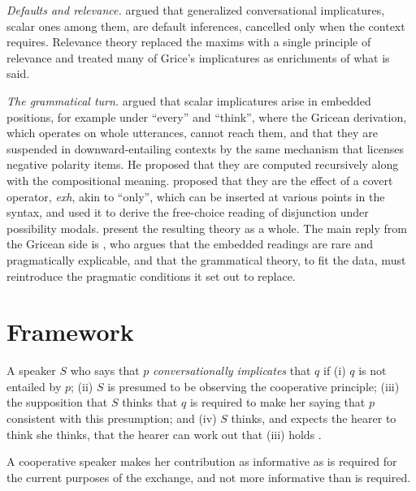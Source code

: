 \documentclass{situationist-preprint}
\begin{document}
\emph{Defaults and relevance.} \citet{Levinson2000} argued that generalized conversational implicatures, scalar ones among them, are default inferences, cancelled only when the context requires. Relevance theory \citep{SperberWilson1986} replaced the maxims with a single principle of relevance and treated many of Grice's implicatures as enrichments of what is said.

\emph{The grammatical turn.} \citet{Chierchia2004} argued that scalar implicatures arise in embedded positions, for example under \enquote{every} and \enquote{think}, where the Gricean derivation, which operates on whole utterances, cannot reach them, and that they are suspended in downward-entailing contexts by the same mechanism that licenses negative polarity items. He proposed that they are computed recursively along with the compositional meaning. \citet{Fox2007} proposed that they are the effect of a covert operator, \emph{exh}, akin to \enquote{only}, which can be inserted at various points in the syntax, and used it to derive the free-choice reading of disjunction under possibility modals. \citet{ChierchiaFoxSpector2012} present the resulting theory as a whole. The main reply from the Gricean side is \citet{Geurts2010}, who argues that the embedded readings are rare and pragmatically explicable, and that the grammatical theory, to fit the data, must reintroduce the pragmatic conditions it set out to replace.

\section{Framework}

\begin{definition}\label{d:imp}
A speaker $S$ who says that $p$ \emph{conversationally implicates} that $q$ if (i) $q$ is not entailed by $p$; (ii) $S$ is presumed to be observing the cooperative principle; (iii) the supposition that $S$ thinks that $q$ is required to make her saying that $p$ consistent with this presumption; and (iv) $S$ thinks, and expects the hearer to think she thinks, that the hearer can work out that (iii) holds \citep{Grice1975}.
\end{definition}

\begin{principle}[Quantity]\label{p:quant}
A cooperative speaker makes her contribution as informative as is required for the current purposes of the exchange, and not more informative than is required.
\end{principle}
\end{document}

